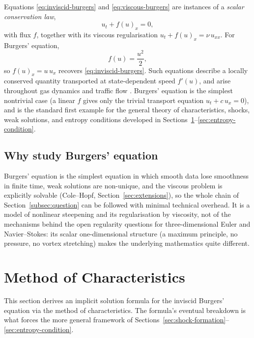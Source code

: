 Equations \eqref{eq:inviscid-burgers} and \eqref{eq:viscous-burgers} are
instances of a \emph{scalar conservation law},
\begin{equation}
  \label{eq:general-conservation-law}
  u_t + f(u)_x = 0,
\end{equation}
with flux $f$, together with its viscous regularisation $u_t + f(u)_x =
\nu\, u_{xx}$. For Burgers' equation,
\begin{equation}
  \label{eq:burgers-flux}
  f(u) = \frac{u^2}{2},
\end{equation}
so $f(u)_x = u\,u_x$ recovers \eqref{eq:inviscid-burgers}. Such equations
describe a locally conserved quantity transported at state-dependent
speed $f'(u)$, and arise throughout gas dynamics and traffic flow
\cite{lighthill1955}. Burgers' equation is the simplest nontrivial case (a
linear $f$ gives only the trivial transport equation $u_t + c\,u_x=0$),
and is the standard first example for the general theory of
characteristics, shocks, weak solutions, and entropy conditions developed
in Sections~\ref{sec:characteristics}--\ref{sec:entropy-condition}.

\subsection{Why study Burgers' equation}
\label{subsec:significance}

Burgers' equation is the simplest equation in which smooth data lose
smoothness in finite time, weak solutions are non-unique, and the viscous
problem is explicitly solvable (Cole--Hopf, Section~\ref{sec:extensions}), so
the whole chain of Section~\ref{subsec:question} can be followed with minimal
technical overhead. It is a model of nonlinear steepening and its
regularisation by viscosity, not of the mechanisms behind the open regularity
questions for three-dimensional Euler and Navier--Stokes: its scalar
one-dimensional structure (a maximum principle, no pressure, no vortex
stretching) makes the underlying mathematics quite different.


\section{Method of Characteristics}
\label{sec:characteristics}

This section derives an implicit solution formula for the inviscid
Burgers' equation via the method of characteristics. The formula's
eventual breakdown is what forces the more general framework of
Sections~\ref{sec:shock-formation}--\ref{sec:entropy-condition}.

